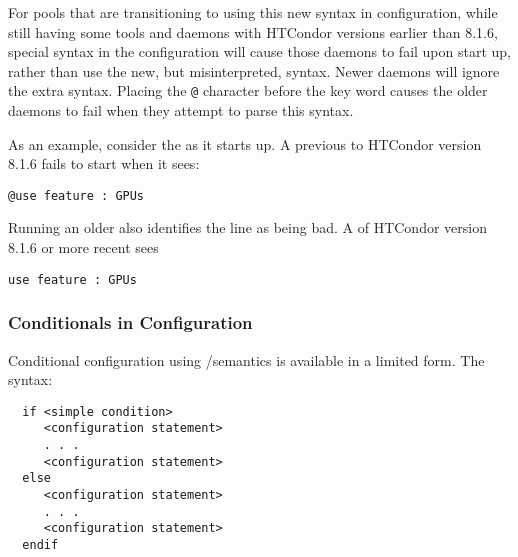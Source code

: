 For pools that are transitioning to using this new syntax in configuration,
while still having some tools and daemons with HTCondor versions 
earlier than 8.1.6,
special syntax in the configuration will cause those daemons to
fail upon start up,
rather than use the new, but misinterpreted, syntax. 
Newer daemons will ignore the extra syntax.
Placing the \verb|@| character before the  key word
causes the older daemons to fail when they attempt to
parse this syntax.

As an example, consider the  as it starts up.
A  previous to HTCondor version 8.1.6 fails to start
when it sees:
\begin{verbatim}
@use feature : GPUs
\end{verbatim}
Running an older  also identifies the 
line as being bad.
A  of HTCondor version 8.1.6 or more recent sees
\begin{verbatim}
use feature : GPUs
\end{verbatim}

\subsubsection{\label{sec:Config-IfElse}Conditionals in Configuration}
Conditional configuration using \verb@if@/\verb@else@ semantics
is available in a limited form.
The syntax:
\begin{verbatim}
  if <simple condition>
     <configuration statement>
     . . .
     <configuration statement>
  else
     <configuration statement>
     . . .
     <configuration statement>
  endif
\end{verbatim}


